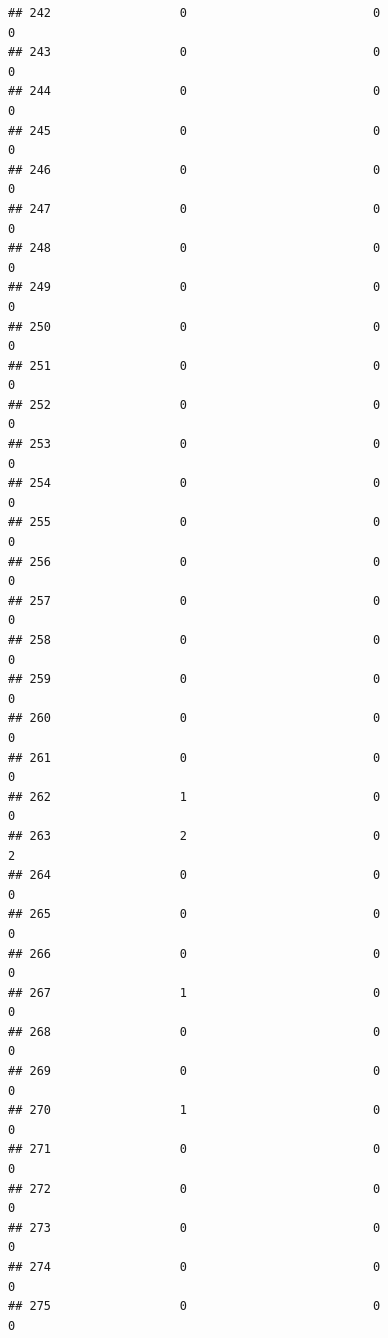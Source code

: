 \documentclass[
]{article}
\begin{document}
\begin{verbatim}
## 242                  0                          0                       0
## 243                  0                          0                       0
## 244                  0                          0                       0
## 245                  0                          0                       0
## 246                  0                          0                       0
## 247                  0                          0                       0
## 248                  0                          0                       0
## 249                  0                          0                       0
## 250                  0                          0                       0
## 251                  0                          0                       0
## 252                  0                          0                       0
## 253                  0                          0                       0
## 254                  0                          0                       0
## 255                  0                          0                       0
## 256                  0                          0                       0
## 257                  0                          0                       0
## 258                  0                          0                       0
## 259                  0                          0                       0
## 260                  0                          0                       0
## 261                  0                          0                       0
## 262                  1                          0                       0
## 263                  2                          0                       2
## 264                  0                          0                       0
## 265                  0                          0                       0
## 266                  0                          0                       0
## 267                  1                          0                       0
## 268                  0                          0                       0
## 269                  0                          0                       0
## 270                  1                          0                       0
## 271                  0                          0                       0
## 272                  0                          0                       0
## 273                  0                          0                       0
## 274                  0                          0                       0
## 275                  0                          0                       0

\end{verbatim}
\end{document}
